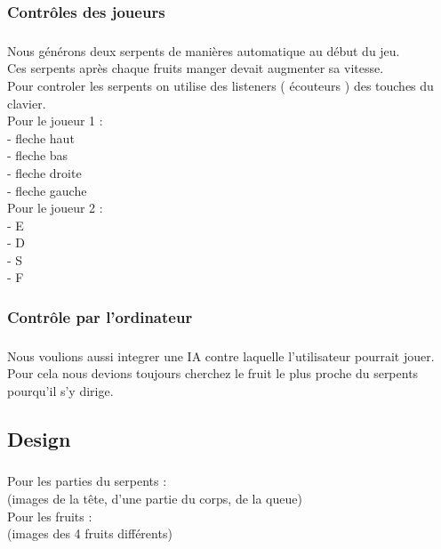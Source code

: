 \documentclass{beamer}
\begin{document}
\subsubsection{Contrôles des joueurs}
\begin{frame}
\frametitle{\insertsubsubsection}
\framesubtitle{\insertsubsection}
\framesubsubtitle{\insertsection}
Nous générons deux serpents de manières automatique au début du jeu.\\
Ces serpents après chaque fruits manger devait augmenter sa vitesse.\\
Pour controler les serpents on utilise des listeners ( écouteurs ) des touches du clavier.\\
Pour le joueur 1 :\\
\indent - fleche haut\\
\indent - fleche bas\\
\indent - fleche droite\\
\indent - fleche gauche\\
Pour le joueur 2 :\\
\indent - E\\
\indent - D\\
\indent - S\\
\indent - F\\

\end{frame}
\subsubsection{Contrôle par l'ordinateur}
\begin{frame}
\frametitle{\insertsubsubsection}
\framesubtitle{\insertsubsection}
\framesubsubtitle{\insertsection}
Nous voulions aussi integrer une IA contre laquelle l'utilisateur pourrait jouer.\\
Pour cela nous devions toujours cherchez le fruit le plus proche du serpents pourqu'il s'y dirige.\\

\end{frame}
\subsection{Design}
\begin{frame}
\frametitle{\insertsubsection}
\framesubtitle{\insertsection}
Pour les parties du serpents :\\
(images de la tête, d'une partie du corps, de la queue)\\
Pour les fruits :\\
(images des 4 fruits différents)

\end{frame}
\end{document}
